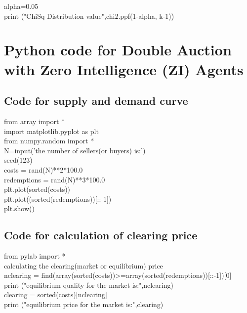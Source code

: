 \documentclass[10pt,a4paper,oneside]{report}
\begin{document}
\begin{appendix}
\begin{listing}
\noindent alpha=0.05\\
print ("ChiSq Distribution value",chi2.ppf(1-alpha, k-1))\\
\end{listing}
\chapter{Python code for Double Auction with Zero Intelligence (ZI) Agents}
\label{ap_2}
\begin{listing}
\section{Code for supply and demand curve}
from array import *\\
import matplotlib.pyplot as plt\\
from numpy.random import *\\
N=input('the number of sellers(or buyers) is:')\\
seed(123)\\
costs = rand(N)**2*100.0\\      %
redemptions = rand(N)**3*100.0\\ %
plt.plot(sorted(costs))\\
plt.plot((sorted(redemptions))[::-1])\\
plt.show()\\
\section{Code for calculation of clearing price}
from pylab import *\\
 calculating the clearing(market or equilibrium) price\\
nclearing = find(array(sorted(costs))>=array(sorted(redemptions))[::-1])[0]\\
print ("equilibrium quality for the market is:",nclearing)\\
clearing = sorted(costs)[nclearing]\\
print ("equilibrium price for the market is:",clearing)\\


\end{listing}
\end{appendix}
\end{document}
